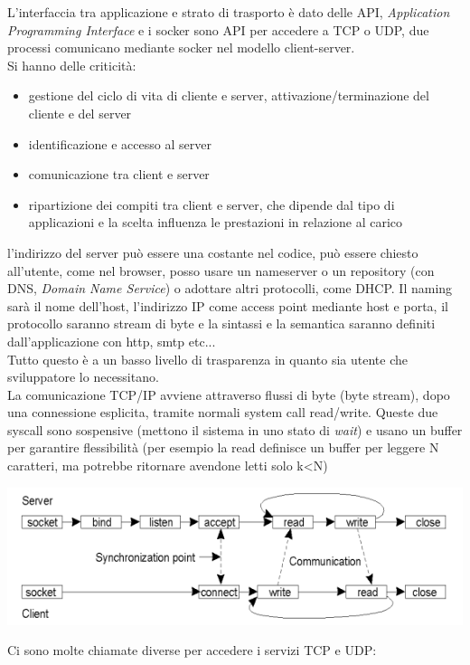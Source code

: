 \documentclass[a4paper,12pt, oneside]{book}
\begin{document}
L'interfaccia tra applicazione e strato di trasporto è dato delle API, \textit{Application Programming Interface}  e i socker sono API per accedere a TCP o UDP, due processi comunicano mediante socker nel modello client-server.\\
Si hanno delle criticità:
\begin{itemize}
	\item gestione del ciclo di vita di cliente e server, attivazione/terminazione del cliente e del server
	\item identificazione e accesso al server
	\item comunicazione tra client e server
	\item ripartizione dei compiti tra client e server, che dipende dal tipo di applicazioni e la scelta influenza le prestazioni in relazione al carico
\end{itemize}
l'indirizzo del server può essere una costante nel codice, può essere chiesto all'utente, come nel browser, posso usare un nameserver o un repository (con DNS, \textit{Domain Name Service}) o adottare altri protocolli, come DHCP. Il naming sarà il nome dell'host, l'indirizzo IP come access point mediante host e porta, il protocollo saranno stream di byte e la sintassi e la semantica saranno definiti dall'applicazione con http, smtp etc...\\
Tutto questo è a un basso livello di trasparenza in quanto sia utente che sviluppatore lo necessitano.\\
La comunicazione TCP/IP avviene attraverso flussi di byte
(byte stream), dopo una connessione esplicita, tramite
normali system call read/write. Queste due syscall sono sospensive (mettono il sistema in uno stato di \textit{wait}) e usano un buffer per garantire flessibilità (per esempio la read definisce un buffer per leggere N caratteri, ma potrebbe ritornare avendone letti solo k<N)
\begin{center}
	\includegraphics[scale=0.7]{img/sc2.png}
\end{center}
\newpage
Ci sono molte chiamate diverse per accedere i servizi TCP e UDP:
\end{document}
